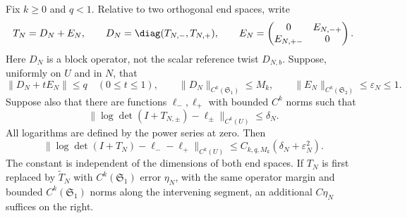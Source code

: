 \begin{proposition}
\label{prop:v76-determinant}
Fix $k\ge0$ and $q<1$.  Relative to two orthogonal end spaces, write
\[
 T_N=D_N+E_N,\qquad D_N=\diag(T_{N,-},T_{N,+}),\qquad
 E_N=\begin{pmatrix}0&E_{N,-+}\\E_{N,+-}&0\end{pmatrix}.
\]
Here $D_N$ is a block operator, not the scalar reference twist
$D_{N,b}$.  Suppose, uniformly on $U$ and in $N$, that
\[
 \|D_N+tE_N\|\le q\quad(0\le t\le1),\qquad
 \|D_N\|_{C^k(\mathfrak S_1)}\le M_k,\qquad
 \|E_N\|_{C^k(\mathfrak S_2)}\le\varepsilon_N\le1.
\]
Suppose also that there are functions $\ell_-,\ell_+$ with bounded
$C^k$ norms such that
\[
 \|\log\det(I+T_{N,\pm})-\ell_\pm\|_{C^k(U)}
 \le\delta_N.
\]
All logarithms are defined by the power series at zero.  Then
\begin{equation}\label{eq:v76-two-end-determinant}
 \|\log\det(I+T_N)-\ell_--\ell_+\|_{C^k(U)}
 \le C_{k,q,M_k}(\delta_N+\varepsilon_N^2).
\end{equation}
The constant is independent of the dimensions of both end spaces.
If $T_N$ is first replaced by $\widetilde T_N$ with
$C^k(\mathfrak S_1)$ error $\eta_N$, with the same operator margin
and bounded $C^k(\mathfrak S_1)$ norms along the intervening segment,
an additional $C\eta_N$ suffices on the right.
\end{proposition}
